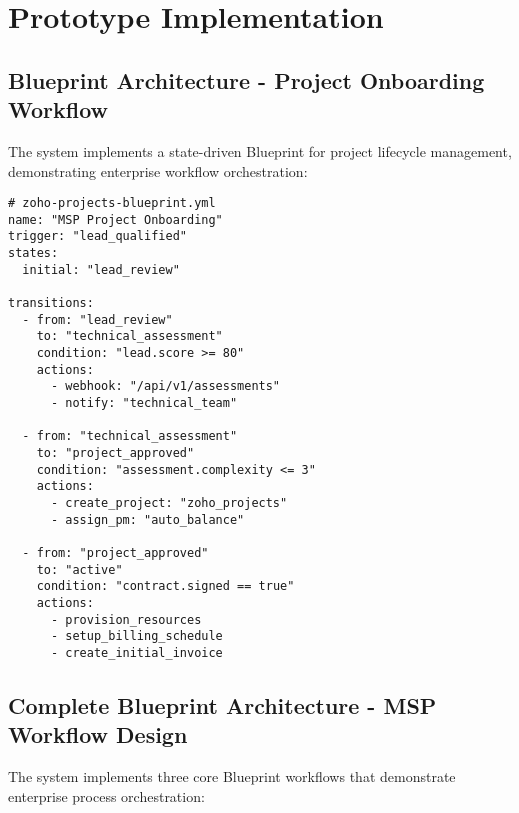 \section{Prototype Implementation}

\subsection{Blueprint Architecture - Project Onboarding Workflow}

The system implements a state-driven Blueprint for project lifecycle management, demonstrating enterprise workflow orchestration:

\begin{verbatim}
# zoho-projects-blueprint.yml
name: "MSP Project Onboarding"
trigger: "lead_qualified"
states:
  initial: "lead_review"
  
transitions:
  - from: "lead_review"
    to: "technical_assessment" 
    condition: "lead.score >= 80"
    actions:
      - webhook: "/api/v1/assessments"
      - notify: "technical_team"
      
  - from: "technical_assessment"
    to: "project_approved"
    condition: "assessment.complexity <= 3"
    actions:
      - create_project: "zoho_projects"
      - assign_pm: "auto_balance"
      
  - from: "project_approved"
    to: "active"
    condition: "contract.signed == true"
    actions:
      - provision_resources
      - setup_billing_schedule
      - create_initial_invoice
\end{verbatim} 

\subsection{Complete Blueprint Architecture - MSP Workflow Design}

The system implements three core Blueprint workflows that demonstrate enterprise process orchestration:

